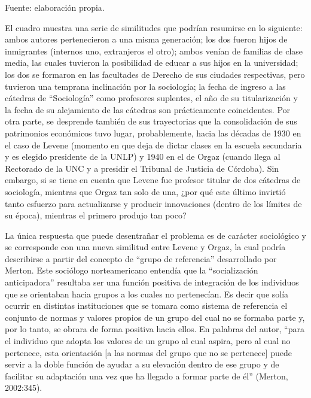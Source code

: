 Fuente: elaboración propia.

El cuadro muestra una serie de similitudes que podrían resumirse en lo siguiente: ambos autores pertenecieron a una misma generación; los dos fueron hijos de inmigrantes (internos uno, extranjeros el otro); ambos venían de familias de clase media, las cuales tuvieron la posibilidad de educar a sus hijos en la universidad; los dos se formaron en las facultades de Derecho de sus ciudades respectivas, pero tuvieron una temprana inclinación por la sociología; la fecha de ingreso a las cátedras de \enquote{Sociología} como profesores suplentes, el año de su titularización y la fecha de su alejamiento de las cátedras son prácticamente coincidentes. Por otra parte, se desprende también de sus trayectorias que la consolidación de sus patrimonios económicos tuvo lugar, probablemente, hacia las décadas de 1930 en el caso de Levene (momento en que deja de dictar clases en la escuela secundaria y es elegido presidente de la UNLP) y 1940 en el de Orgaz (cuando llega al Rectorado de la UNC y a presidir el Tribunal de Justicia de Córdoba). Sin embargo, si se tiene en cuenta que Levene fue profesor titular de dos cátedras de sociología, mientras que Orgaz tan solo de una, ¿por qué este último invirtió tanto esfuerzo para actualizarse y producir innovaciones (dentro de los límites de su época), mientras el primero produjo tan poco?

La única respuesta que puede desentrañar el problema es de carácter sociológico y se corresponde con una nueva similitud entre Levene y Orgaz, la cual podría describirse a partir del concepto de \enquote{grupo de referencia} desarrollado por Merton. Este sociólogo norteamericano entendía que la \enquote{socialización anticipadora} resultaba ser una función positiva de integración de los individuos que se orientaban hacia grupos a los cuales no pertenecían. Es decir que solía ocurrir en distintas instituciones que se tomara como sistema de referencia el conjunto de normas y valores propios de un grupo del cual no se formaba parte y, por lo tanto, se obrara de forma positiva hacia ellos. En palabras del autor, \enquote{para el individuo que adopta los valores de un grupo al cual aspira, pero al cual no pertenece, esta orientación [a las normas del grupo que no se pertenece] puede servir a la doble función de ayudar a su elevación dentro de ese grupo y de facilitar su adaptación una vez que ha llegado a formar parte de él} (Merton, 2002:345).

